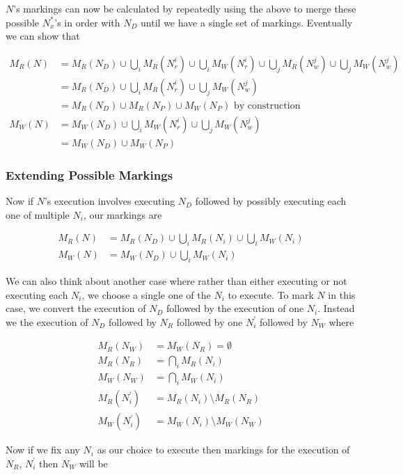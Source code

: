 \documentclass[twoside,a4paper]{report}
\begin{document}
$N$'s markings can now be calculated by repeatedly using the above to merge these possible $N^*_x$'s in order with $N_D$ until we have a single set of markings.
Eventually we can show that 

\begin{align*}
M_R(N) &= M_R(N_D) \cup \bigcup_i M_R(N_r^i) \cup \bigcup_i M_W(N_r^i) \cup \bigcup_j M_R(N_w^j) \cup \bigcup_j M_W(N_w^j) \\
       &= M_R(N_D) \cup \bigcup_i M_R(N_r^i) \cup \bigcup_j M_W(N_w^j) \\
       &= M_R(N_D) \cup M_R(N_P) \cup M_W(N_P) \text{ by construction} \\
M_W(N) &= M_W(N_D) \cup \bigcup_i M_W(N_r^i) \cup \bigcup_j M_W(N_w^j) \\
       &= M_W(N_D) \cup M_W(N_P)
\end{align*}

\subsubsection{Extending Possible Markings}

Now if $N$'s execution involves executing $N_D$ followed by possibly executing each one of multiple $N_i$, our markings are

\begin{align*}
M_R(N) &= M_R(N_D) \cup \bigcup_i M_R(N_i) \cup \bigcup_i M_W(N_i) \\
M_W(N) &= M_W(N_D) \cup \bigcup_i M_W(N_i)
\end{align*}

We can also think about another case where rather than either executing or not executing each $N_i$, we choose a single one of the
$N_i$ to execute. To mark $N$ in this case, we convert the execution of $N_D$ followed by the execution of one $N_i$. Instead we the
execution of $N_D$ followed by $N_R$ followed by one $N_i^\prime$ followed by $N_W$ where

\begin{align*}
M_R(N_W) &= M_W(N_R) = \emptyset \\
M_R(N_R)        &= \bigcap_i M_R(N_i) \\
M_W(N_W)        &= \bigcap_i M_W(N_i) \\
M_R(N_i^\prime) &= M_R(N_i) \setminus M_R(N_R) \\
M_W(N_i^\prime) &= M_W(N_i) \setminus M_W(N_W)
\end{align*} 

Now if we fix any $N_i$ as our choice to execute then markings for the execution of $N_R$, $N_i^\prime$ then $N_W$ will be
\end{document}
